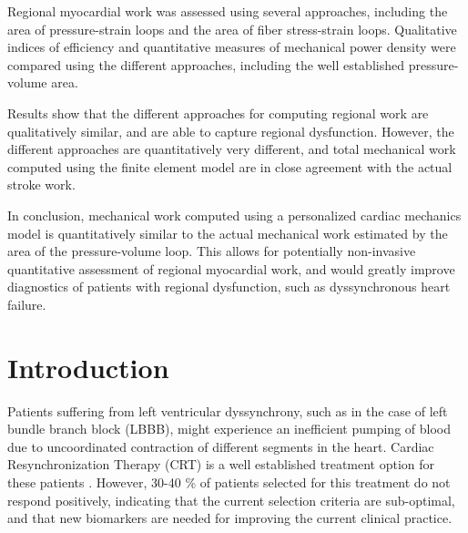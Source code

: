   Regional myocardial work was assessed using several approaches,
  including the area of pressure-strain loops and the area of fiber stress-strain
  loops. Qualitative indices of efficiency and quantitative measures of
  mechanical power density were compared using the different approaches,
  including the well established pressure-volume area.

  Results show that the different approaches for computing regional
  work are qualitatively similar, and are able to capture regional
  dysfunction. However, the different approaches are quantitatively
  very different, and total mechanical work computed using the finite
  element model are in close agreement with the actual stroke work.

  In conclusion, mechanical work computed using a personalized cardiac
  mechanics model is quantitatively similar to the actual mechanical
  work estimated by the area of the pressure-volume loop. This allows
  for potentially non-invasive quantitative assessment of regional
  myocardial work, and would greatly improve diagnostics of patients
  with regional dysfunction, such as dyssynchronous heart failure. 


\section{Introduction}




Patients suffering
from left ventricular dyssynchrony, such as in the 
case of left bundle branch block (LBBB), might experience an inefficient pumping
of blood due to uncoordinated contraction of different
segments in the heart. Cardiac Resynchronization Therapy (CRT) is
a well established treatment option for these patients \cite[Section
8.2]{ponikowski20162016}. However, 30-40 \% of patients selected for
this treatment do not respond positively, indicating that the current
selection criteria are sub-optimal, and that new biomarkers are needed
for improving the current clinical practice. 

